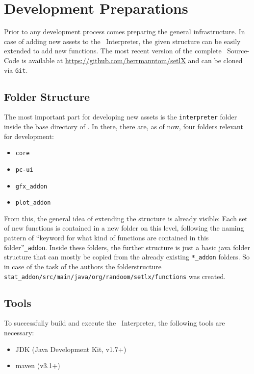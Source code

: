 

\chapter{Development Preparations}

Prior to any development process comes preparing the general infrastructure. In case of adding new assets to the \setlx\ Interpreter, the given structure can be easily extended to add new functions. The most recent version of the complete \setlx\ Source-Code is available at \href{https://github.com/herrmanntom/setlX}{https://github.com/herrmanntom/setlX} and can be cloned via \lstinline{Git}.

\section{Folder Structure}

The most important part for developing new assets is the \lstinline{interpreter} folder inside the base directory of \setlx. In there, there are, as of now, four folders relevant for development:

\begin{itemize}
	\item \lstinline{core}
	\item \lstinline{pc-ui}
	\item \lstinline{gfx_addon}
	\item \lstinline{plot_addon}
\end{itemize}

From this, the general idea of extending the structure is already visible: Each set of new functions is contained in a new folder on this level, following the naming pattern of \enquote{keyword for what kind of functions are contained in this folder}\lstinline{_addon}. Inside these folders, the further structure is just a basic java folder structure that can mostly be copied from the already existing \lstinline{*_addon} folders. So in case of the task of the authors the folderstructure \lstinline{stat_addon/src/main/java/org/randoom/setlx/functions} was created.

\section{Tools}

To successfully build and execute the \setlx\ Interpreter, the following tools are necessary:

\begin{itemize}
 \item JDK (Java Development Kit, v1.7+)
 \item maven (v3.1+)
\end{itemize}

